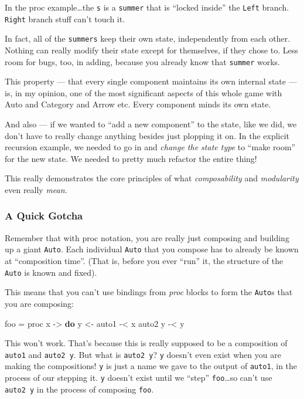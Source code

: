 \documentclass[]{article}
\newenvironment{Shaded}{}{}
\newcommand{\KeywordTok}[1]{\textcolor[rgb]{0.00,0.44,0.13}{\textbf{{#1}}}}
\newcommand{\OtherTok}[1]{\textcolor[rgb]{0.00,0.44,0.13}{{#1}}}
\newcommand{\FunctionTok}[1]{\textcolor[rgb]{0.02,0.16,0.49}{{#1}}}
\newcommand{\NormalTok}[1]{{#1}}
\begin{document}
In the proc example\ldots{}the \texttt{s} is a \texttt{summer} that is ``locked
inside'' the \texttt{Left} branch. \texttt{Right} branch stuff can't touch it.

In fact, all of the \texttt{summers} keep their own state, independently from
each other. Nothing can really modify their state except for themselves, if they
chose to. Less room for bugs, too, in adding, because you already know that
\texttt{summer} works.

This property --- that every single component maintains its own internal state
--- is, in my opinion, one of the most significant aspects of this whole game
with Auto and Category and Arrow etc. Every component minds its own state.

And also --- if we wanted to ``add a new component'' to the state, like we did,
we don't have to really change anything besides just plopping it on. In the
explicit recursion example, we needed to go in and \emph{change the state type}
to ``make room'' for the new state. We needed to pretty much refactor the entire
thing!

This really demonstrates the core principles of what \emph{composability} and
\emph{modularity} even really \emph{mean}.

\subsubsection{A Quick Gotcha}\label{a-quick-gotcha}

Remember that with proc notation, you are really just composing and building up
a giant \texttt{Auto}. Each individual \texttt{Auto} that you compose has to
already be known at ``composition time''. (That is, before you ever ``run'' it,
the structure of the \texttt{Auto} is known and fixed).

This means that you can't use bindings from \emph{proc} blocks to form the
\texttt{Auto}s that you are composing:

\begin{Shaded}
\begin{Highlighting}[]
\NormalTok{foo }\FunctionTok{=} \NormalTok{proc x }\OtherTok{->} \KeywordTok{do}
    \NormalTok{y }\OtherTok{<-} \NormalTok{auto1 }\FunctionTok{-<} \NormalTok{x}
    \NormalTok{auto2 y }\FunctionTok{-<} \NormalTok{y}
\end{Highlighting}
\end{Shaded}

This won't work. That's because this is really supposed to be a composition of
\texttt{auto1} and \texttt{auto2\ y}. But what is \texttt{auto2\ y}? \texttt{y}
doesn't even exist when you are making the compositions! \texttt{y} is just a
name we gave to the output of \texttt{auto1}, in the process of our stepping it.
\texttt{y} doesn't exist until we ``step'' \texttt{foo}\ldots{}so can't use
\texttt{auto2\ y} in the process of composing \texttt{foo}.
\end{document}

